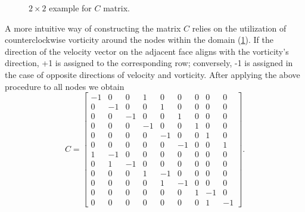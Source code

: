 \documentclass{article}
\numberwithin{equation}{section}
\begin{document}
\begin{figure}[H] %
  \caption{$2\times 2$ example for $C$ matrix.}\label{fig:C-example-2x2}
\end{figure}
A more intuitive way of constructing the matrix $C$ relies on the utilization of counterclockwise vorticity around the nodes within the domain (\cref{fig:C-example-2x2}). If the direction of the velocity vector on the adjacent face aligns with the vorticity's direction, +1 is assigned to the corresponding row; conversely, -1 is assigned in the case of opposite directions of velocity and vorticity. After applying the above procedure to all nodes we obtain
\begin{equation}
C=\left[
\begin{array}{rrrrrrrrr}
-1 & 0 & 0 & 1 & 0 & 0 & 0 & 0 & 0 \\
0 & -1 & 0 & 0 & 1 & 0 & 0 & 0 & 0 \\
0 & 0 & -1 & 0 & 0 & 1 & 0 & 0 & 0 \\
0 & 0 & 0 & -1 & 0 & 0 & 1 & 0 & 0 \\
0 & 0 & 0 & 0 & -1 & 0 & 0 & 1 & 0 \\
0 & 0 & 0 & 0 & 0 & -1 & 0 & 0 & 1 \\
1 & -1 & 0 & 0 & 0 & 0 & 0 & 0 & 0 \\
0 & 1 & -1 & 0 & 0 & 0 & 0 & 0 & 0 \\
0 & 0 & 0 & 1 & -1 & 0 & 0 & 0 & 0 \\
0 & 0 & 0 & 0 & 1 & -1 & 0 & 0 & 0 \\
0 & 0 & 0 & 0 & 0 & 0 & 1 & -1 & 0 \\
0 & 0 & 0 & 0 & 0 & 0 & 0 & 1 & -1
\end{array}
\right].
\end{equation}
\end{document}
